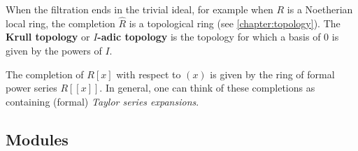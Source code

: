     \begin{property}
        When the filtration ends in the trivial ideal, for example when $R$ is a Noetherian local ring, the completion $\widehat{R}$ is a topological ring (see \cref{chapter:topology}). The \textbf{Krull topology} or \textbf{$I$-adic topology} is the topology for which a basis of $0$ is given by the powers of $I$.
    \end{property}

    \begin{example}
        The completion of $R[x]$ with respect to $(x)$ is given by the ring of formal power series $R[[x]]$. In general, one can think of these completions as containing (formal) \textit{Taylor series expansions}.
    \end{example}

\subsection{Modules}

